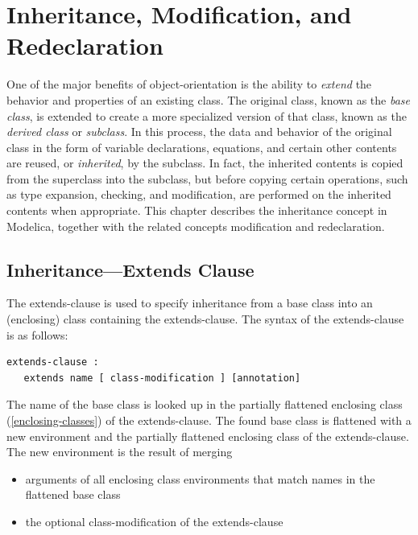 \documentclass[10pt,a4paper]{report}
\def\doublelabel#1{\label{#1}}
\begin{document}
\chapter{Inheritance, Modification, and Redeclaration}\doublelabel{inheritance-modification-and-redeclaration}

One of the major benefits of object-orientation is the ability to
\emph{extend} the behavior and properties of an existing class. The
original class, known as the \emph{base class}, is extended to create a
more specialized version of that class, known as the \emph{derived
class} or \emph{subclass}. In this process, the data and behavior of the
original class in the form of variable declarations, equations, and
certain other contents are reused, or \emph{inherited}, by the subclass.
In fact, the inherited contents is copied from the superclass into the
subclass, but before copying certain operations, such as type expansion,
checking, and modification, are performed on the inherited contents when
appropriate. This chapter describes the inheritance concept in Modelica,
together with the related concepts modification and redeclaration.

\section{Inheritance---Extends Clause}\doublelabel{inheritance-extends-clause}

The extends-clause is used to specify inheritance from a base class into
an (enclosing) class containing the extends-clause. The syntax of the
extends-clause is as follows:

\begin{lstlisting}[language=grammar]
extends-clause :
   extends name [ class-modification ] [annotation]
\end{lstlisting}
The name of the base class is looked up in the partially flattened
enclosing class (\ref{enclosing-classes}) of the extends-clause. The found base
class is flattened with a new environment and the partially flattened
enclosing class of the extends-clause. The new environment is the result
of merging

\begin{itemize}
\item
  arguments of all enclosing class environments that match names in the
  flattened base class
\item
  the optional class-modification of the extends-clause
\end{itemize}
\end{document}
